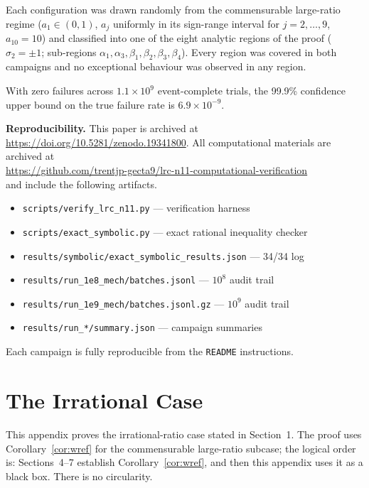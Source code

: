 \documentclass[12pt,a4paper]{amsart}
\theoremstyle{definition}
\theoremstyle{remark}
\begin{document}
Each configuration was drawn randomly from the commensurable large-ratio regime
($a_1\in(0,1)$, $a_j$ uniformly in its sign-range interval for $j=2,\ldots,9$,
$a_{10}=10$) and classified into one of the eight analytic regions of the proof
($\sigma_2=\pm1$; sub-regions $\alpha_1,\alpha_3,\beta_1,\beta_2,\beta_3,\beta_4$).
Every region was covered in both campaigns and no exceptional behaviour was observed
in any region.

With zero failures across $1.1\times10^{9}$ event-complete trials, the 99.9\%
confidence upper bound on the true failure rate is $6.9\times10^{-9}$.

\medskip
\noindent\textbf{Reproducibility.}
This paper is archived at \url{https://doi.org/10.5281/zenodo.19341800}.
All computational materials are archived at\\
\url{https://github.com/trentjp-gecta9/lrc-n11-computational-verification}\\
and include the following artifacts.
\begin{itemize}\setlength{\itemsep}{1pt}
  \item \texttt{scripts/verify\_lrc\_n11.py} --- verification harness
  \item \texttt{scripts/exact\_symbolic.py} --- exact rational inequality checker
  \item \texttt{results/symbolic/exact\_symbolic\_results.json} --- 34/34 log
  \item \texttt{results/run\_1e8\_mech/batches.jsonl} --- $10^8$ audit trail
  \item \texttt{results/run\_1e9\_mech/batches.jsonl.gz} --- $10^9$ audit trail
  \item \texttt{results/run\_*/summary.json} --- campaign summaries
\end{itemize}
Each campaign is fully reproducible from the \texttt{README} instructions.

\section{The Irrational Case}\label{app:irrational}

This appendix proves the irrational-ratio case stated in Section~1. The proof uses
Corollary~\ref{cor:wref} for the commensurable large-ratio subcase; the logical order
is: Sections~4--7 establish Corollary~\ref{cor:wref}, and then this appendix uses it
as a black box. There is no circularity.
\end{document}
